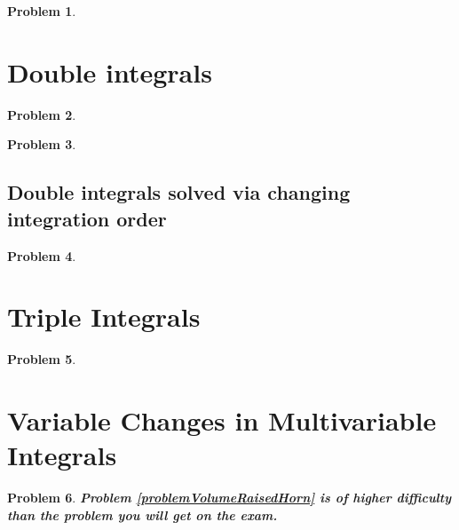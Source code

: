 \documentclass{article}
\newtheorem{problem}{Problem}
\begin{document}
\begin{problem}

\end{problem}


\section{Double integrals}

\begin{problem}

\end{problem}

\begin{problem}

\end{problem}

\subsection{Double integrals solved via changing integration order}

\begin{problem}

\end{problem}

\section{Triple Integrals}
\begin{problem}

\end{problem}

\section{Variable Changes in Multivariable Integrals}
\begin{problem}
\textbf{Problem \ref{problemVolumeRaisedHorn} is of higher difficulty than the problem you will get on the exam.}


\end{problem}
\end{document}
